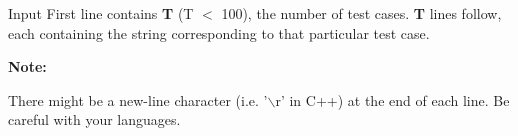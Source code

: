 Input
First line contains   \textbf{    T   }   (T $<$ 100), the number of test cases.   \textbf{    T   }   lines follow, each containing the string corresponding to that particular test case.  

\textbf{    Note:   }

   There might be a new-line character (i.e. '$\backslash$r' in C++) at the end of each line. Be careful with your languages.